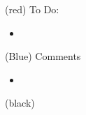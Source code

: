 

\color(red)
To Do:

\begin{itemize}
	\item
\end{itemize}


\color(Blue)
Comments 


	\begin{itemize}
		\item 
	\end{itemize}

\color(black)